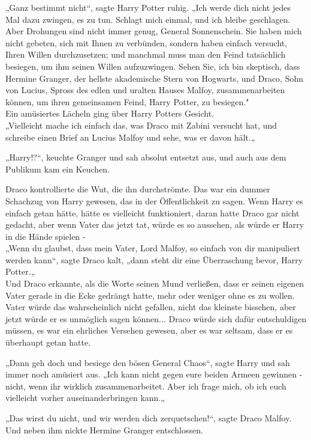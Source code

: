 {„Ganz bestimmt nicht“, sagte Harry Potter ruhig. „Ich werde dich nicht jedes Mal dazu zwingen, es zu tun. Schlagt mich einmal, und ich bleibe geschlagen.\\ Aber Drohungen sind nicht immer genug, General Sonnenschein. Sie haben mich nicht gebeten, sich mit Ihnen zu verbünden, sondern haben einfach versucht, Ihren Willen durchzusetzen; und manchmal muss man den Feind tatsächlich besiegen, um ihm seinen Willen aufzuzwingen. Sehen Sie, ich bin skeptisch, dass Hermine Granger, der hellste akademische Stern von Hogwarts, und Draco, Sohn von Lucius, Spross des edlen und uralten Hauses Malfoy, zusammenarbeiten können, um ihren gemeinsamen Feind, Harry Potter, zu besiegen."\\ Ein amüsiertes Lächeln ging über Harry Potters Gesicht.\\ „Vielleicht mache ich einfach das, was Draco mit Zabini versucht hat, und schreibe einen Brief an Lucius Malfoy und sehe, was er davon hält.„

„Harry!?“, keuchte Granger und sah absolut entsetzt aus, und auch aus dem Publikum kam ein Keuchen.

Draco kontrollierte die Wut, die ihn durchströmte. Das war ein dummer Schachzug von Harry gewesen, das in der Öffentlichkeit zu sagen. Wenn Harry es einfach getan hätte, hätte es vielleicht funktioniert, daran hatte Draco gar nicht gedacht, aber wenn Vater das jetzt tat, würde es so aussehen, als würde er Harry in die Hände spielen -\\ „Wenn du glaubst, dass mein Vater, Lord Malfoy, so einfach von dir manipuliert werden kann“, sagte Draco kalt, „dann steht dir eine Überraschung bevor, Harry Potter.„\\ Und Draco erkannte, als die Worte seinen Mund verließen, dass er seinen eigenen Vater gerade in die Ecke gedrängt hatte, mehr oder weniger ohne es zu wollen.\\ Vater würde das wahrscheinlich nicht gefallen, nicht das kleinste bisschen, aber jetzt würde er es unmöglich sagen können... Draco würde sich dafür entschuldigen müssen, es war ein ehrliches Versehen gewesen, aber es war seltsam, dass er es überhaupt getan hatte.

„Dann geh doch und besiege den bösen General Chaos“, sagte Harry und sah immer noch amüsiert aus. „Ich kann nicht gegen eure beiden Armeen gewinnen - nicht, wenn ihr wirklich zusammenarbeitet. Aber ich frage mich, ob ich euch vielleicht vorher auseinanderbringen kann.„

„Das wirst du nicht, und wir werden dich zerquetschen!“, sagte Draco Malfoy.\\ Und neben ihm nickte Hermine Granger entschlossen.

}
